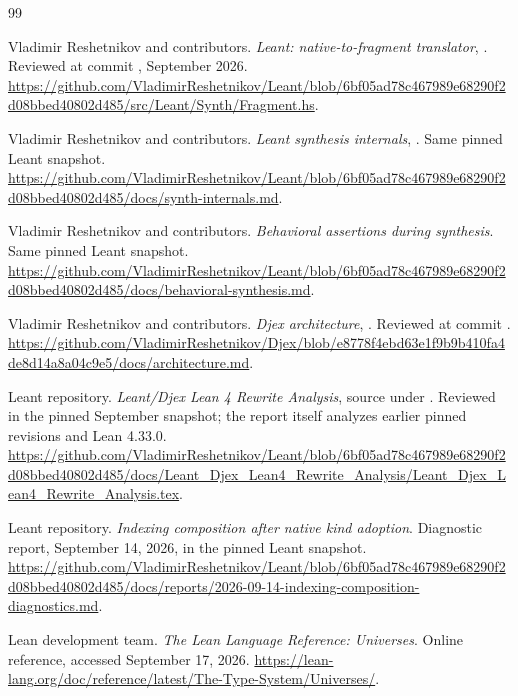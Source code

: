 \par{}
\begin{thebibliography}{99}
\small\raggedright
\setlength{\itemsep}{3pt}
\setlength{\parskip}{0pt}
Vladimir Reshetnikov and contributors.
\emph{Leant: native-to-fragment translator}, .
Reviewed at commit , September 2026.
\url{https://github.com/VladimirReshetnikov/Leant/blob/6bf05ad78c467989e68290f2d08bbed40802d485/src/Leant/Synth/Fragment.hs}.

Vladimir Reshetnikov and contributors.
\emph{Leant synthesis internals}, .
Same pinned Leant snapshot.
\url{https://github.com/VladimirReshetnikov/Leant/blob/6bf05ad78c467989e68290f2d08bbed40802d485/docs/synth-internals.md}.

Vladimir Reshetnikov and contributors.
\emph{Behavioral assertions during synthesis}.
Same pinned Leant snapshot.
\url{https://github.com/VladimirReshetnikov/Leant/blob/6bf05ad78c467989e68290f2d08bbed40802d485/docs/behavioral-synthesis.md}.

Vladimir Reshetnikov and contributors.
\emph{Djex architecture}, .
Reviewed at commit .
\url{https://github.com/VladimirReshetnikov/Djex/blob/e8778f4ebd63e1f9b9b410fa4de8d14a8a04c9e5/docs/architecture.md}.

Leant repository.
\emph{Leant/Djex Lean 4 Rewrite Analysis}, source under
.
Reviewed in the pinned September snapshot; the report itself analyzes earlier pinned revisions and Lean 4.33.0.
\url{https://github.com/VladimirReshetnikov/Leant/blob/6bf05ad78c467989e68290f2d08bbed40802d485/docs/Leant_Djex_Lean4_Rewrite_Analysis/Leant_Djex_Lean4_Rewrite_Analysis.tex}.

Leant repository.
\emph{Indexing composition after native kind adoption}.
Diagnostic report, September 14, 2026, in the pinned Leant snapshot.
\url{https://github.com/VladimirReshetnikov/Leant/blob/6bf05ad78c467989e68290f2d08bbed40802d485/docs/reports/2026-09-14-indexing-composition-diagnostics.md}.

Lean development team.
\emph{The Lean Language Reference: Universes}.
Online reference, accessed September 17, 2026.
\url{https://lean-lang.org/doc/reference/latest/The-Type-System/Universes/}.


\end{thebibliography}
